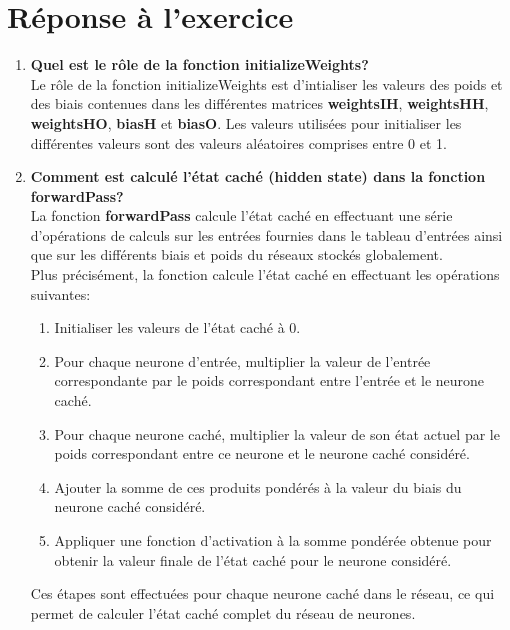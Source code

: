 \documentclass[a4paper, 12pt, openany]{book}
\begin{document}
\section{Réponse à l'exercice}
\begin{enumerate}
  \item {
    \textbf{Quel est le rôle de la fonction initializeWeights?} \vspace{0.2cm}\\
    Le rôle de la fonction initializeWeights est d'intialiser les valeurs des poids et des biais contenues 
    dans les différentes matrices \textbf{weightsIH}, \textbf{weightsHH}, \textbf{weightsHO}, \textbf{biasH} et \textbf{biasO}. 
    Les valeurs utilisées pour initialiser les différentes valeurs sont des valeurs aléatoires comprises entre 0 et 1.
  } \\
  \item {
    \textbf{Comment est calculé l'état caché (hidden state) dans la fonction forwardPass?} \vspace{0.2cm}\\
    La fonction \textbf{forwardPass} calcule l'état caché en effectuant une série d'opérations de calculs sur les entrées fournies
    dans le tableau d'entrées ainsi que sur les différents biais et poids du réseaux stockés globalement. \\
    Plus précisément, la fonction calcule l'état caché en effectuant les opérations suivantes:
    \begin{enumerate}
      \item Initialiser les valeurs de l'état caché à 0.
      \item Pour chaque neurone d'entrée, multiplier la valeur de l'entrée correspondante par le poids correspondant entre l'entrée et le neurone caché.
      \item Pour chaque neurone caché, multiplier la valeur de son état actuel par le poids correspondant entre ce neurone et le neurone caché considéré.
      \item Ajouter la somme de ces produits pondérés à la valeur du biais du neurone caché considéré.
      \item Appliquer une fonction d'activation à la somme pondérée obtenue pour obtenir la valeur finale de l'état caché pour le neurone considéré.
    \end{enumerate}
    Ces étapes sont effectuées pour chaque neurone caché dans le réseau, ce qui permet de calculer l'état caché complet du réseau de neurones.
  } \\

\end{enumerate}
\end{document}
